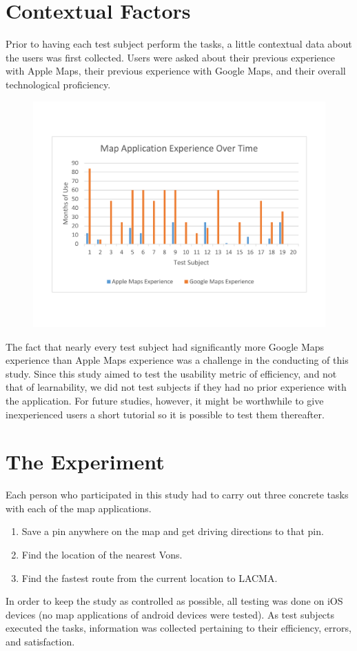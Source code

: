 \documentclass[a4paper; 11pt]{article}
\begin{document}
\section{Contextual Factors}
Prior to having each test subject perform the tasks, a little contextual data about the users was first collected. Users were asked about their previous experience with Apple Maps, their previous experience with Google Maps, and their overall technological proficiency.
\vspace{-.2in}
\begin{figure}[ht]
\begin{center}
\includegraphics[keepaspectratio, width=.7\textwidth ]{user_context.pdf}
\end{center}
\end{figure}
\clearpage
\par
The fact that nearly every test subject had significantly more Google Maps experience than Apple Maps experience was a challenge in the conducting of this study.  Since this study aimed to test the usability metric of efficiency, and not that of learnability, we did not test subjects if they had no prior experience with the application. For future studies, however, it might be worthwhile to give inexperienced users a short tutorial so it is possible to test them thereafter.



\section{The Experiment} \label{sec:Experiment}
Each person who participated in this study had to carry out three concrete tasks with each of the map applications.
\begin{enumerate}
  \item Save a pin anywhere on the map and get driving directions to that pin.
  \item Find the location of the nearest Vons.
  \item Find the fastest route from the current location to LACMA.
\end{enumerate}
In order to keep the study as controlled as possible, all testing was done on iOS devices (no map applications of android devices were tested). As test subjects executed the tasks, information was collected pertaining to their efficiency, errors, and satisfaction.
\end{document}
